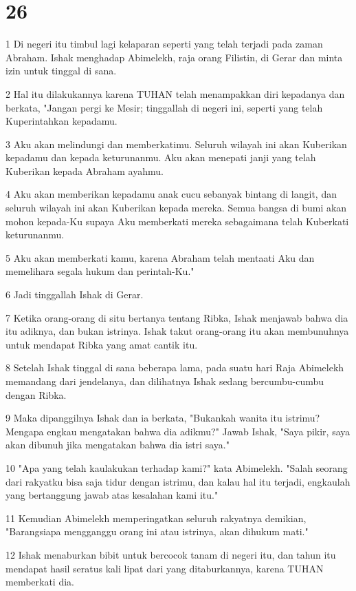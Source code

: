 \chapter{26}

\par 1 Di negeri itu timbul lagi kelaparan seperti yang telah terjadi pada zaman Abraham. Ishak menghadap Abimelekh, raja orang Filistin, di Gerar dan minta izin untuk tinggal di sana.
\par 2 Hal itu dilakukannya karena TUHAN telah menampakkan diri kepadanya dan berkata, "Jangan pergi ke Mesir; tinggallah di negeri ini, seperti yang telah Kuperintahkan kepadamu.
\par 3 Aku akan melindungi dan memberkatimu. Seluruh wilayah ini akan Kuberikan kepadamu dan kepada keturunanmu. Aku akan menepati janji yang telah Kuberikan kepada Abraham ayahmu.
\par 4 Aku akan memberikan kepadamu anak cucu sebanyak bintang di langit, dan seluruh wilayah ini akan Kuberikan kepada mereka. Semua bangsa di bumi akan mohon kepada-Ku supaya Aku memberkati mereka sebagaimana telah Kuberkati keturunanmu.
\par 5 Aku akan memberkati kamu, karena Abraham telah mentaati Aku dan memelihara segala hukum dan perintah-Ku."
\par 6 Jadi tinggallah Ishak di Gerar.
\par 7 Ketika orang-orang di situ bertanya tentang Ribka, Ishak menjawab bahwa dia itu adiknya, dan bukan istrinya. Ishak takut orang-orang itu akan membunuhnya untuk mendapat Ribka yang amat cantik itu.
\par 8 Setelah Ishak tinggal di sana beberapa lama, pada suatu hari Raja Abimelekh memandang dari jendelanya, dan dilihatnya Ishak sedang bercumbu-cumbu dengan Ribka.
\par 9 Maka dipanggilnya Ishak dan ia berkata, "Bukankah wanita itu istrimu? Mengapa engkau mengatakan bahwa dia adikmu?" Jawab Ishak, "Saya pikir, saya akan dibunuh jika mengatakan bahwa dia istri saya."
\par 10 "Apa yang telah kaulakukan terhadap kami?" kata Abimelekh. "Salah seorang dari rakyatku bisa saja tidur dengan istrimu, dan kalau hal itu terjadi, engkaulah yang bertanggung jawab atas kesalahan kami itu."
\par 11 Kemudian Abimelekh memperingatkan seluruh rakyatnya demikian, "Barangsiapa mengganggu orang ini atau istrinya, akan dihukum mati."
\par 12 Ishak menaburkan bibit untuk bercocok tanam di negeri itu, dan tahun itu mendapat hasil seratus kali lipat dari yang ditaburkannya, karena TUHAN memberkati dia.
